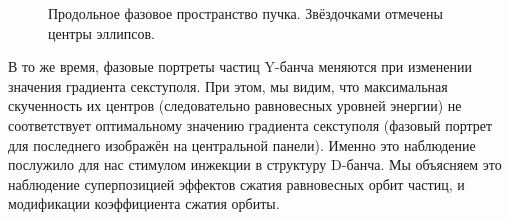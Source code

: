 \begin{figure}[H]
	\centering
	\caption[Продольное фазовое пространство пучка. 
	Звёздочками отмечены центры эллипсов]{Продольное фазовое пространство пучка. 
		Звёздочками отмечены центры эллипсов.\label{fig:long_PS_sext_settings}}
\end{figure}

В то же время, фазовые портреты частиц Y-банча меняются при изменении значения градиента секступоля. 
При этом, мы видим, что максимальная скученность их центров (следовательно равновесных уровней энергии) 
не соответствует оптимальному значению градиента секступоля (фазовый портрет для последнего изображён 
на центральной панели). Именно это наблюдение послужило для нас стимулом инжекции в структуру D-банча. 
Мы объясняем это наблюдение суперпозицией эффектов сжатия равновесных орбит частиц, 
и модификации коэффициента сжатия орбиты.

